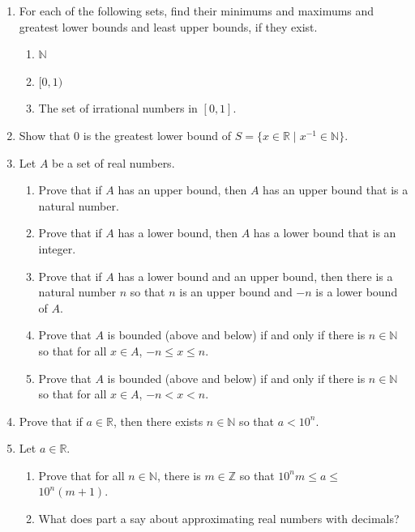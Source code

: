 \documentclass[11pt]{article}
\theoremstyle{definition}
\begin{document}
\begin{enumerate}

\item For each of the following sets, find their minimums and maximums and greatest lower bounds and least upper bounds, if they exist.
  \begin{enumerate}
    \item $\mathbb{N}$
    \item $[0,1)$
    \item The set of irrational numbers in $[0,1]$.
  \end{enumerate}
\item Show that $0$ is the greatest lower bound of $S = \{ x \in \mathbb{R} \mid x^{-1}\in \mathbb{N}\}$.

\item Let $A$ be a set of real numbers.

\begin{enumerate}
\item Prove that if $A$ has an upper bound, then $A$ has an upper bound that
is a natural number.

\item Prove that if $A$ has a lower bound, then $A$ has a lower bound that is
an integer.

\item Prove that if $A$ has a lower bound and an upper bound, then there is a
natural number $n$ so that $n$ is an upper bound and $-n$ is a lower bound of
$A$.

\item Prove that $A$ is bounded (above and below) if and only if there is
$n\in \mathbb{N}$ so that for all $x\in A$, $-n\leq x\leq n$.

\item Prove that $A$ is bounded (above and below) if and only if there is
$n\in \mathbb{N}$ so that for all $x\in A$, $-n<x<n$.
\end{enumerate}

\item Prove that if $a\in\mathbb{R}$, then there exists $n\in \mathbb{N}$ so that $a<10^{n}$.

\item Let $a\in\mathbb{R}$.
\begin{enumerate}
\item Prove that for all $n\in\mathbb{N}$, there is $m\in \mathbb{Z}$ so that $10^{n}m\leq a\leq$ $10^{n}(m+1)$.
\item What does part a say about approximating real numbers with decimals?
\end{enumerate}


\end{enumerate}
\end{document}
